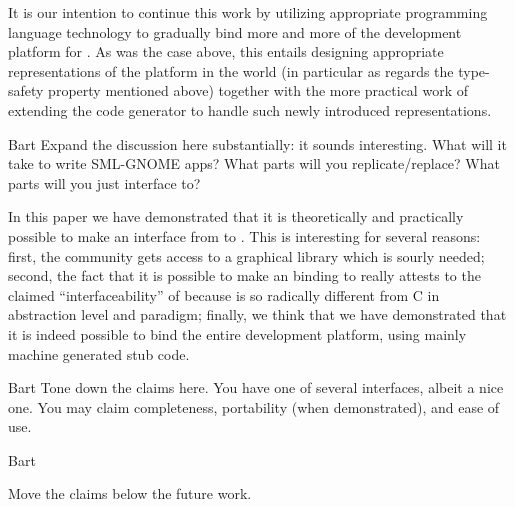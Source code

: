 \documentclass[workingdraft]{usetex-v1}
\begin{document}
It is our intention to continue this work by utilizing appropriate
programming language technology to gradually bind more and more of the
\gnome development platform for \sml. As was the case above, this
entails designing appropriate representations of the platform in the
\sml world (in particular as regards the type-safety property mentioned
above) together with the more practical work of extending the code
generator to handle such newly introduced representations.


\begin{ednote}{Bart}
  Expand the discussion here substantially: it sounds
interesting.  What will it take to write SML-GNOME apps?
What parts will you replicate/replace?  What parts will you
just interface to?

\end{ednote}

In this paper we have demonstrated that it is theoretically and
practically possible to make an interface from \sml to \gtk.  This is
interesting for several reasons: first, the \sml community gets
access to a graphical library which is sourly needed; second, the fact
that it is possible to make an \sml binding to \gtk really attests to
the claimed ``interfaceability'' of \gtk because \sml is so radically
different from C in abstraction level and paradigm; finally, we think
that we have demonstrated that it is indeed possible to bind the entire \gnome
development platform, using mainly machine generated stub code.

\begin{ednote}{Bart}
  Tone down the claims here.  You have one of several
interfaces, albeit a nice one.  You may claim completeness,
portability (when demonstrated), and ease of use.

\end{ednote}


\begin{ednote}{Bart}
  
Move the claims below the future work.

\end{ednote}



\end{document}
